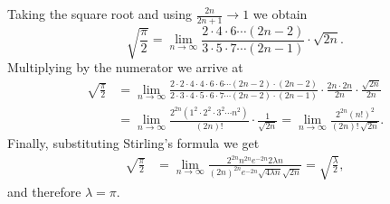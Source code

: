 \documentclass[12pt]{article}
\theoremstyle{definition}
\begin{document}
Taking the square root and using $\frac{2n}{2n+1} \to 1$ we obtain
\[
\sqrt{\frac{\pi}{2}}
=
\lim_{n\to\infty}
\frac
{2 \cdot 4 \cdot 6 \cdots (2n-2)}
{3 \cdot 5 \cdot 7 \cdots (2n-1)}
\cdot
\sqrt{2n}
.
\]
Multiplying by the numerator we arrive at
\begin{align*}
\sqrt{\frac{\pi}{2}}
&
=
\lim_{n\to\infty}
\frac
{2 \cdot 2 \cdot 4 \cdot 4 \cdot 6 \cdot 6 \cdots (2n-2) \cdot (2n-2)}
{2 \cdot 3 \cdot 4 \cdot 5 \cdot 6 \cdot 7 \cdots (2n-2) \cdot (2n-1)}
\cdot
\frac
{2n \cdot 2n}
{2n}
\cdot
\frac{\sqrt{2n}}{2n}
\\
&
=
\lim_{n\to\infty}
\frac
{2^{2n}\left( 1^2 \cdot 2^2 \cdot 3^2 \cdots n^2 \right)}
{(2n)!}
\cdot
\frac{1}{\sqrt{2n}}
=
\lim_{n\to\infty}
\frac
{2^{2n} (n!)^2}
{(2n)! \, \sqrt{2n}}
.
\end{align*}
Finally, substituting Stirling's formula we get
\begin{align*}
\sqrt{\frac{\pi}{2}}
&
=
\lim_{n\to\infty}
\frac
{2^{2n} n^{2n} e^{-2n} 2 \lambda n}
{{(2n)}^{2n} e^{-2n} \sqrt{4 \lambda n}\sqrt{2n}}
=
\sqrt{\frac{\lambda}{2}}
,
\end{align*}
and therefore $\lambda=\pi$.
\end{document}
